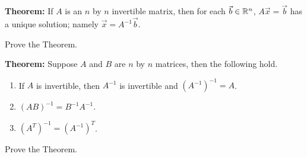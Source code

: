 \documentclass[12pt,letterpaper]{article}
\begin{document}
\begin{enumerate}
{\bf Theorem:} If $A$ is an $n$ by $n$ invertible matrix, then for each $\vec{b}\in \mathbb{R}^n$, $A\vec{x}=\vec{b}$ has a unique solution; namely $\vec{x}=A^{-1}\vec{b}$.

\Problem Prove the Theorem.

\vfill

\newpage

{\bf Theorem:} Suppose $A$ and $B$ are $n$ by $n$ matrices, then the following hold. 
\begin{enumerate}
\item If $A$ is invertible, then $A^{-1}$ is invertible and $(A^{-1})^{-1}=A$.
\item $(AB)^{-1}=B^{-1} A^{-1}$.
\item $(A^{T})^{-1}=(A^{-1})^{T}$.
\end{enumerate}

\Problem Prove the Theorem.

 

\end{enumerate}

\newpage
{}%
\lhead{}
\rhead{}
\thispagestyle{fancy}
\end{document}

